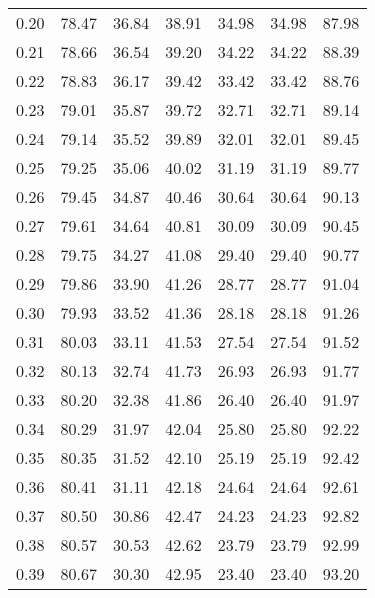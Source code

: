 \begin{tabular}{|c|c|c|c|c|c|c|}
      0.20 &     78.47 &     36.84 &      38.91 &   34.98 &      34.98 &         87.98 \\
      0.21 &     78.66 &     36.54 &      39.20 &   34.22 &      34.22 &         88.39 \\
      0.22 &     78.83 &     36.17 &      39.42 &   33.42 &      33.42 &         88.76 \\
      0.23 &     79.01 &     35.87 &      39.72 &   32.71 &      32.71 &         89.14 \\
      0.24 &     79.14 &     35.52 &      39.89 &   32.01 &      32.01 &         89.45 \\
      0.25 &     79.25 &     35.06 &      40.02 &   31.19 &      31.19 &         89.77 \\
      0.26 &     79.45 &     34.87 &      40.46 &   30.64 &      30.64 &         90.13 \\
      0.27 &     79.61 &     34.64 &      40.81 &   30.09 &      30.09 &         90.45 \\
      0.28 &     79.75 &     34.27 &      41.08 &   29.40 &      29.40 &         90.77 \\
      0.29 &     79.86 &     33.90 &      41.26 &   28.77 &      28.77 &         91.04 \\
      0.30 &     79.93 &     33.52 &      41.36 &   28.18 &      28.18 &         91.26 \\
      0.31 &     80.03 &     33.11 &      41.53 &   27.54 &      27.54 &         91.52 \\
      0.32 &     80.13 &     32.74 &      41.73 &   26.93 &      26.93 &         91.77 \\
      0.33 &     80.20 &     32.38 &      41.86 &   26.40 &      26.40 &         91.97 \\
      0.34 &     80.29 &     31.97 &      42.04 &   25.80 &      25.80 &         92.22 \\
      0.35 &     80.35 &     31.52 &      42.10 &   25.19 &      25.19 &         92.42 \\
      0.36 &     80.41 &     31.11 &      42.18 &   24.64 &      24.64 &         92.61 \\
      0.37 &     80.50 &     30.86 &      42.47 &   24.23 &      24.23 &         92.82 \\
      0.38 &     80.57 &     30.53 &      42.62 &   23.79 &      23.79 &         92.99 \\
      0.39 &     80.67 &     30.30 &      42.95 &   23.40 &      23.40 &         93.20 \\

\end{tabular}
